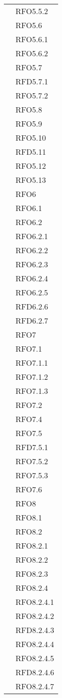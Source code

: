 \begin{longtable}{ p{12cm} | p{4cm} }
& RFO5.5.2 \\
& RFO5.6\\
& RFO5.6.1 \\
& RFO5.6.2 \\
& RFO5.7 \\
& RFD5.7.1 \\
& RFO5.7.2 \\
& RFO5.8 \\
& RFO5.9 \\
& RFO5.10 \\
& RFD5.11 \\
& RFO5.12 \\
& RFO5.13 \\
& RFO6 \\
& RFO6.1 \\
& RFO6.2 \\
& RFO6.2.1 \\
& RFO6.2.2 \\
& RFO6.2.3 \\
& RFO6.2.4 \\
& RFO6.2.5 \\
& RFD6.2.6 \\
& RFD6.2.7 \\
	& RFO7 \\
& RFO7.1 \\
& RFO7.1.1 \\
& RFO7.1.2 \\
& RFO7.1.3 \\
& RFO7.2 \\
& RFO7.4 \\
& RFO7.5 \\
& RFD7.5.1 \\
& RFO7.5.2 \\
& RFO7.5.3 \\
& RFO7.6 \\	 	    
	& RFO8 \\
& RFO8.1 \\
& RFO8.2 \\
& RFO8.2.1 \\
& RFO8.2.2 \\
& RFO8.2.3 \\
& RFO8.2.4 \\
& RFO8.2.4.1 \\
& RFO8.2.4.2 \\
& RFD8.2.4.3 \\
& RFO8.2.4.4 \\
& RFO8.2.4.5 \\
& RFD8.2.4.6 \\
& RFO8.2.4.7 \\

\end{longtable}
